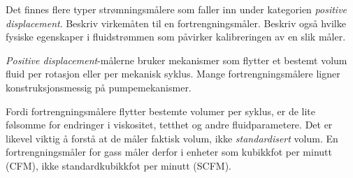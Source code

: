 

Det finnes flere typer strømningsmålere som faller inn under kategorien {\it positive displacement}. Beskriv virkemåten til en fortrengningsmåler. Beskriv også hvilke fysiske egenskaper i fluidstrømmen som påvirker kalibreringen av en slik måler.







{\it Positive displacement}-målerne bruker mekanismer som flytter et bestemt volum fluid per rotasjon eller per mekanisk syklus. Mange fortrengningsmålere ligner konstruksjonsmessig på pumpemekanismer.

Fordi fortrengningsmålere flytter bestemte volumer per syklus, er de lite følsomme for endringer i viskositet, tetthet og andre fluidparametere. Det er likevel viktig å forstå at de måler faktisk volum, ikke {\it standardisert} volum. En fortrengningsmåler for gass måler derfor i enheter som kubikkfot per minutt (CFM), ikke standardkubikkfot per minutt (SCFM).










